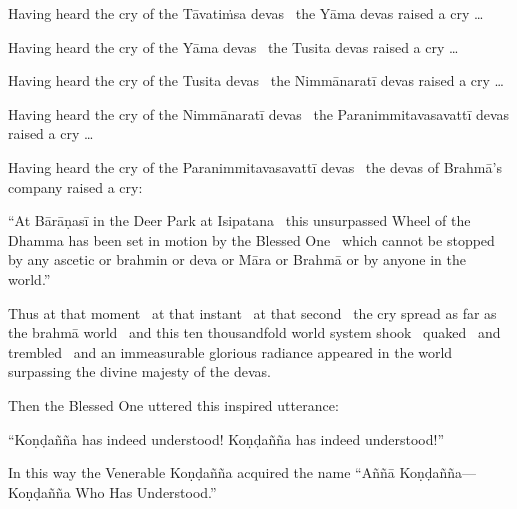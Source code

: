 \begin{english-hang}
Having heard the cry of the Tāvatiṁsa devas \breathmark\ the Yāma devas raised a cry …
\end{english-hang}

\begin{english-hang}
Having heard the cry of the Yāma devas \breathmark\ the Tusita devas raised a cry …
\end{english-hang}

\begin{english-hang}
Having heard the cry of the Tusita devas \breathmark\ the Nimmānaratī devas raised a cry …
\end{english-hang}

\begin{english-hang}
Having heard the cry of the Nimmānaratī devas \breathmark\ the Paranimmitavasavattī devas raised a cry …
\end{english-hang}

\begin{english-hang}
Having heard the cry of the Paranimmitavasavattī devas \breathmark\ the devas of Brahmā's company raised a cry:
\end{english-hang}

\begin{english-hang}
``At Bārāṇasī in the Deer Park at Isipatana \breathmark\ this unsurpassed Wheel of the Dhamma has been set in motion by the Blessed One \breathmark\ which cannot be stopped by any ascetic or brahmin or deva or Māra or Brahmā or by anyone in the world.''
\end{english-hang}

\begin{english-hang}
Thus at that moment \breathmark\ at that instant \breathmark\ at that second \breathmark\ the cry spread as far as the brahmā world \breathmark\ and this ten thousandfold world system shook \breathmark\ quaked \breathmark\ and trembled \breathmark\ and an immeasurable glorious radiance appeared in the world surpassing the divine majesty of the devas.
\end{english-hang}

\begin{english-hang}
Then the Blessed One uttered this inspired utterance:
\end{english-hang}

\begin{english-hang}
``Koṇḍañña has indeed understood! Koṇḍañña has indeed understood!''
\end{english-hang}

\begin{english-hang}
In this way the Venerable Koṇḍañña acquired the name ``Aññā Koṇḍañña—Koṇḍañña Who Has Understood.''
\end{english-hang}

\suttaRef{[SN 56.11]}

